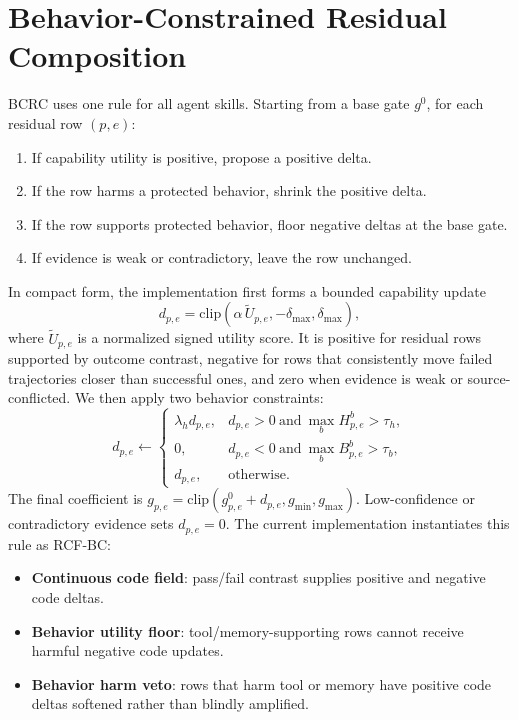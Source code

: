 \documentclass{article}
\newcommand{\bcrc}{\textsc{BCRC}\xspace}
\newcommand{\rcfbc}{\textsc{RCF-BC}\xspace}
\begin{document}
\section{Behavior-Constrained Residual Composition}

\bcrc uses one rule for all agent skills.  Starting from a base gate $g^0$, for each residual row $(p,e)$:

\begin{enumerate}[leftmargin=*]
    \item If capability utility is positive, propose a positive delta.
    \item If the row harms a protected behavior, shrink the positive delta.
    \item If the row supports protected behavior, floor negative deltas at the base gate.
    \item If evidence is weak or contradictory, leave the row unchanged.
\end{enumerate}

In compact form, the implementation first forms a bounded capability update
\begin{equation}
    d_{p,e}=\mathrm{clip}(\alpha\,\widetilde{U}_{p,e},-\delta_{\max},\delta_{\max}),
\end{equation}
where $\widetilde{U}_{p,e}$ is a normalized signed utility score.  It is positive for residual rows supported by outcome contrast, negative for rows that consistently move failed trajectories closer than successful ones, and zero when evidence is weak or source-conflicted.  We then apply two behavior constraints:
\begin{equation}
d_{p,e}\leftarrow
\begin{cases}
\lambda_h d_{p,e}, & d_{p,e}>0 \ \mathrm{and}\ \max_b H^b_{p,e}>\tau_h,\\
0, & d_{p,e}<0 \ \mathrm{and}\ \max_b B^b_{p,e}>\tau_b,\\
d_{p,e}, & \mathrm{otherwise}.
\end{cases}
\end{equation}
The final coefficient is $g_{p,e}=\mathrm{clip}(g^0_{p,e}+d_{p,e},g_{\min},g_{\max})$.  Low-confidence or contradictory evidence sets $d_{p,e}=0$.  The current implementation instantiates this rule as \rcfbc:

\begin{itemize}[leftmargin=*]
    \item \textbf{Continuous code field}: pass/fail contrast supplies positive and negative code deltas.
    \item \textbf{Behavior utility floor}: tool/memory-supporting rows cannot receive harmful negative code updates.
    \item \textbf{Behavior harm veto}: rows that harm tool or memory have positive code deltas softened rather than blindly amplified.
\end{itemize}
\end{document}
